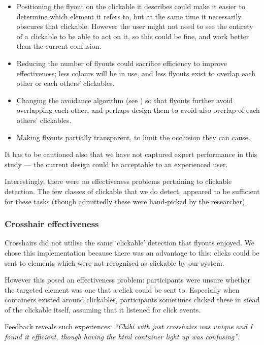 \documentclass[a4paper, 12pt]{report}
\begin{document}
\begin{itemize}
\item Positioning the flyout on the clickable it describes could make it easier to determine which element it refers to, but at the same time it necessarily obscures that clickable. However the user might not need to see the entirety of a clickable to be able to act on it, so this could be fine, and work better than the current confusion.
\item Reducing the number of flyouts could sacrifice efficiency to improve effectiveness; less colours will be in use, and less flyouts exist to overlap each other or each others' clickables.
\item Changing the avoidance algorithm (see ) so that flyouts further avoid overlapping each other, and perhaps design them to avoid also overlap of each others' clickables.
\item Making flyouts partially transparent, to limit the occlusion they can cause.
\end{itemize}

It has to be cautioned also that we have not captured expert performance in this study --- the current design could be acceptable to an experienced user.

Interestingly, there were no effectiveness problems pertaining to clickable detection. The few classes of clickable that we do detect, appeared to be sufficient for these tasks (though admittedly these were hand-picked by the researcher).

\subsubsection{Crosshair effectiveness}
\label{sec:crosshair_effectiveness}
Crosshairs did not utilise the same `clickable' detection that flyouts enjoyed. We chose this implementation because there was an advantage to this: clicks could be sent to elements which were not recognised as clickable by our system.

However this posed an effectiveness problem: participants were unsure whether the targeted element was one that a click could be sent to. Especially when containers existed around clickables, participants sometimes clicked these in stead of the clickable itself, assuming that it listened for click events.

Feedback reveals such experiences: \textit{``Chibi with just crosshairs was unique and I found it efficient, though having the html container light up was confusing''}.
\end{document}
